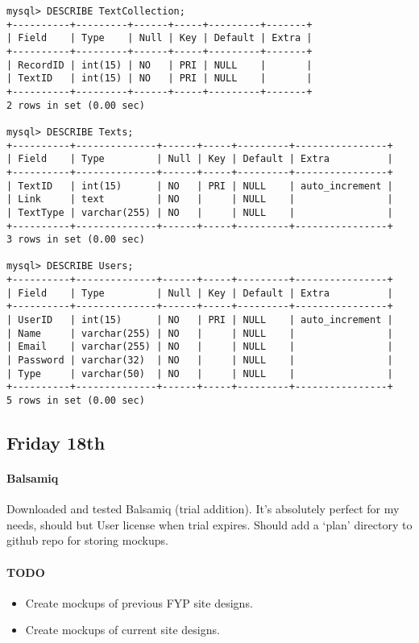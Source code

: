\begin{verbatim}
mysql> DESCRIBE TextCollection;
+----------+---------+------+-----+---------+-------+
| Field    | Type    | Null | Key | Default | Extra |
+----------+---------+------+-----+---------+-------+
| RecordID | int(15) | NO   | PRI | NULL    |       |
| TextID   | int(15) | NO   | PRI | NULL    |       |
+----------+---------+------+-----+---------+-------+
2 rows in set (0.00 sec)

mysql> DESCRIBE Texts;
+----------+--------------+------+-----+---------+----------------+
| Field    | Type         | Null | Key | Default | Extra          |
+----------+--------------+------+-----+---------+----------------+
| TextID   | int(15)      | NO   | PRI | NULL    | auto_increment |
| Link     | text         | NO   |     | NULL    |                |
| TextType | varchar(255) | NO   |     | NULL    |                |
+----------+--------------+------+-----+---------+----------------+
3 rows in set (0.00 sec)

mysql> DESCRIBE Users;
+----------+--------------+------+-----+---------+----------------+
| Field    | Type         | Null | Key | Default | Extra          |
+----------+--------------+------+-----+---------+----------------+
| UserID   | int(15)      | NO   | PRI | NULL    | auto_increment |
| Name     | varchar(255) | NO   |     | NULL    |                |
| Email    | varchar(255) | NO   |     | NULL    |                |
| Password | varchar(32)  | NO   |     | NULL    |                |
| Type     | varchar(50)  | NO   |     | NULL    |                |
+----------+--------------+------+-----+---------+----------------+
5 rows in set (0.00 sec)
\end{verbatim}

\subsection{Friday 18th}
\paragraph{Balsamiq} Downloaded and tested Balsamiq (trial addition). It's
absolutely perfect for my needs, should but User license when trial
expires. Should add a `plan' directory to github repo for storing mockups.

\paragraph{TODO}
\begin{itemize}
\item Create mockups of previous FYP site designs.
\item Create mockups of current site designs.
\end{itemize}

